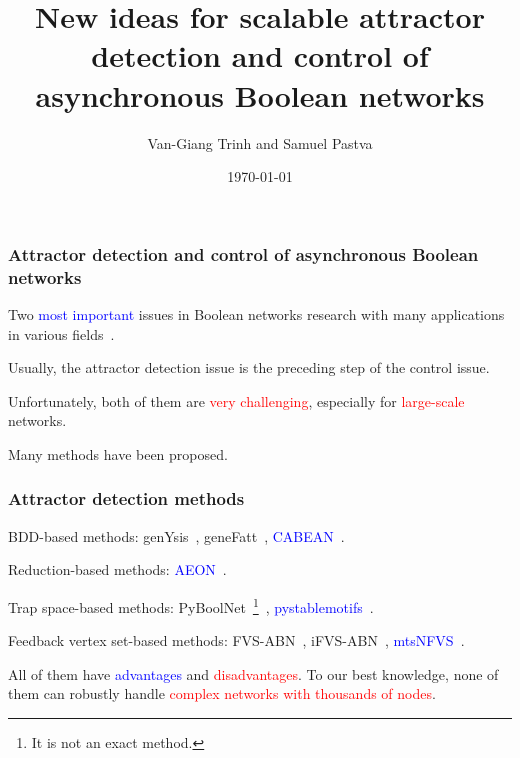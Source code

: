 \documentclass{beamer}              %
\title{New ideas for scalable attractor detection and control of asynchronous Boolean networks}
\author[Van-Giang Trinh]{Van-Giang Trinh\inst{1} and Samuel Pastva\inst{2}}
\date{\today}
\institute[] %
{
  \inst{1}
  LIS, Aix-Marseille University, Marseille, France
  
  \inst{2}
  Institute of Science and Technology, Austria
}
\newcommand{\blue}[1]{\textcolor{blue}{#1}}
\newcommand{\red}[1]{\textcolor{red}{#1}}
\begin{document}
\begin{frame}
  \titlepage
\end{frame}

\begin{frame}
  \frametitle{Attractor detection and control of asynchronous Boolean networks}

Two \blue{most important} issues in Boolean networks research with many applications in various fields~\cite{akutsu2018algorithms, schwab2020concepts}.

\hspace{0.8cm}

Usually, the attractor detection issue is the preceding step of the control issue.

\hspace{0.8cm}

Unfortunately, both of them are \red{very challenging}, especially for \red{large-scale} networks.

\hspace{0.8cm}

Many methods have been proposed.

\end{frame}

\begin{frame}
  \frametitle{Attractor detection methods}

BDD-based methods: genYsis~\cite{DBLP:journals/bioinformatics/GargCXMM08}, geneFatt~\cite{zheng2013efficient}, \blue{CABEAN}~\cite{DBLP:journals/tcbb/MizeraP0Y19, DBLP:conf/fm/SuP21}.

\hspace{0.8cm}

Reduction-based methods: \blue{AEON}~\cite{DBLP:conf/cav/BenesBPS21}.

\hspace{0.8cm}

Trap space-based methods: PyBoolNet~\footnote{It is not an exact method.}~\cite{klarner2017pyboolnet}, \blue{pystablemotifs}~\cite{Rozum2021, rozum2021pystablemotifs}.

\hspace{0.8cm}

Feedback vertex set-based methods: FVS-ABN~\cite{GiangTCBB2020}, iFVS-ABN~\cite{DBLP:conf/cibcb/GiangH21}, \blue{mtsNFVS}~\cite{DBLP:conf/bcb/TrinhHB22}.

\hspace{0.8cm}

All of them have \blue{advantages} and \red{disadvantages}.
To our best knowledge, none of them can robustly handle \red{complex networks with thousands of nodes}.

\end{frame}
\end{document}

